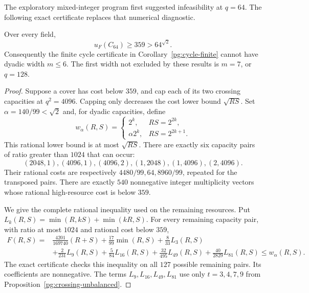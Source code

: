 The exploratory mixed-integer program first suggested
infeasibility at $q=64$. The following exact certificate replaces
that numerical diagnostic.

\begin{proposition}[PG-CYCLE-Q64]
\label{pg:cycle-q64}
Over every field,
\[
 u_F(C_{64})\geq359>64^{\sqrt2}.
\]
Consequently the finite cycle certificate in
Corollary~\ref{pg:cycle-finite} cannot have dyadic width $m\leq6$.
The first width not excluded by these results is $m=7$, or $q=128$.
\end{proposition}
\begin{proof}
Suppose a cover has cost below $359$, and cap each of its two
crossing capacities at $q^2=4096$. Capping only decreases the
cost lower bound $\sqrt{RS}$. Set $\alpha=140/99<\sqrt2$ and,
for dyadic capacities, define
\[
 w_\alpha(R,S)=
 \begin{cases}
 2^k,&RS=2^{2k},\\
 \alpha2^k,&RS=2^{2k+1}.
 \end{cases}
\]
This rational lower bound is at most $\sqrt{RS}$.
There are exactly six capacity pairs of ratio greater than
$1024$ that can occur:
\[
 (2048,1),(4096,1),(4096,2),
 (1,2048),(1,4096),(2,4096).
 \tag{PG-Q64-high}
\]
Their rational costs are respectively
$4480/99,64,8960/99$, repeated for the transposed pairs.
There are exactly $540$ nonnegative integer multiplicity vectors
whose rational high-resource cost is below $359$.

We give the complete rational inequality used on the remaining
resources. Put
$L_k(R,S)=\min(R,kS)+\min(kR,S)$. For every remaining capacity
pair, with ratio at most $1024$ and rational cost below $359$,
\begin{align*}
 F(R,S)={}&\frac{4201}{169740}(R+S)
 +\frac{17}{99}\min(R,S)+\frac8{33}L_3(R,S)\\
 &+\frac2{231}L_9(R,S)+\frac5{84}L_{16}(R,S)
 +\frac{32}{495}L_{49}(R,S)+\frac{40}{2829}L_{81}(R,S)
 \leq w_\alpha(R,S).
\end{align*}
The exact certificate checks this inequality on all $127$
possible remaining pairs. Its coefficients are nonnegative.
The terms $L_9,L_{16},L_{49},L_{81}$ use only
$t=3,4,7,9$ from Proposition~\ref{pg:crossing-unbalanced}.


\end{proof}
